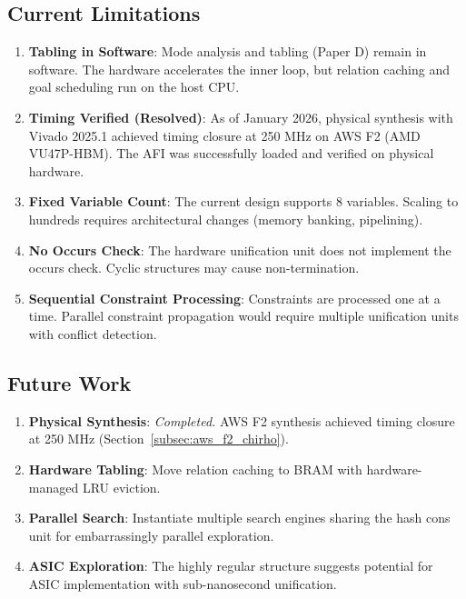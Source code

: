 \documentclass[11pt,a4paper]{article}
\begin{document}
\subsection{Current Limitations}
\label{subsec:current_limits_chirho}

\begin{enumerate}
  \item \textbf{Tabling in Software}: Mode analysis and tabling (Paper D) remain
    in software. The hardware accelerates the inner loop, but relation caching
    and goal scheduling run on the host CPU.

  \item \textbf{Timing Verified (Resolved)}: As of January 2026, physical synthesis
    with Vivado 2025.1 achieved timing closure at 250 MHz on AWS F2 (AMD VU47P-HBM).
    The AFI was successfully loaded and verified on physical hardware.

  \item \textbf{Fixed Variable Count}: The current design supports 8 variables.
    Scaling to hundreds requires architectural changes (memory banking, pipelining).

  \item \textbf{No Occurs Check}: The hardware unification unit does not implement
    the occurs check. Cyclic structures may cause non-termination.

  \item \textbf{Sequential Constraint Processing}: Constraints are processed
    one at a time. Parallel constraint propagation would require multiple
    unification units with conflict detection.
\end{enumerate}

\subsection{Future Work}
\label{subsec:future_chirho}

\begin{enumerate}
  \item \textbf{Physical Synthesis}: \emph{Completed.} AWS F2 synthesis achieved
    timing closure at 250 MHz (Section~\ref{subsec:aws_f2_chirho}).

  \item \textbf{Hardware Tabling}: Move relation caching to BRAM with
    hardware-managed LRU eviction.

  \item \textbf{Parallel Search}: Instantiate multiple search engines sharing
    the hash cons unit for embarrassingly parallel exploration.

  \item \textbf{ASIC Exploration}: The highly regular structure suggests
    potential for ASIC implementation with sub-nanosecond unification.
\end{enumerate}
\end{document}
